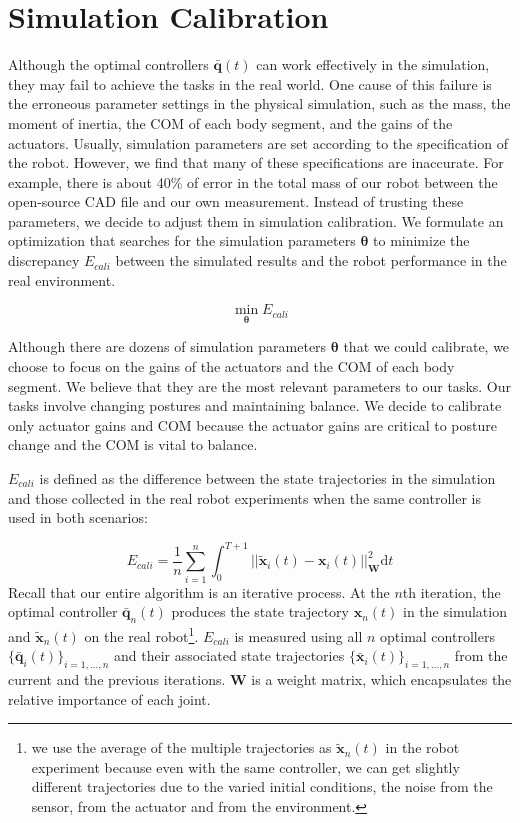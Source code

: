\section{Simulation Calibration}
Although the optimal controllers $\bar{\mathbf{q}}(t)$ can work effectively in the simulation, they may fail to achieve the tasks in the real world. One cause of this failure is the erroneous parameter settings in the physical simulation, such as the mass, the moment of inertia, the COM of each body segment, and the gains of the actuators. Usually, simulation parameters are set according to the specification of the robot. However, we find that many of these specifications are inaccurate. For example, there is about 40\% of error in the total mass of our robot between the open-source CAD file and our own measurement. Instead of trusting these parameters, we decide to adjust them in simulation calibration. We formulate an optimization that searches for the simulation parameters $\boldsymbol{\theta}$ to minimize the discrepancy $E_{cali}$ between the simulated results and the robot performance in the real environment.

\begin{equation}
 \min_{\boldsymbol{\theta}} E_{cali}
\label{eqn:calibration}
\end{equation}

Although there are dozens of simulation parameters $\boldsymbol{\theta}$ that we could calibrate, we choose to focus on the gains of the actuators and the COM of each body segment. We believe that they are the most relevant parameters to our tasks. Our tasks involve changing postures and maintaining balance. We decide to calibrate only actuator gains and COM because the actuator gains are critical to posture change and the COM is vital to balance.

$E_{cali}$ is defined as the difference between the state trajectories in the simulation and those collected in the real robot experiments when the same controller is used in both scenarios:

\begin{equation}
  E_{cali}=\frac{1}{n}\sum_{i=1}^{n}\int_{0}^{T+1}||\tilde{\mathbf{x}}_i(t)-\mathbf{x}_i(t)||_{\mathbf{W}}^2\mathrm{d}t
  \label{eqn:calibrationObj}
\end{equation}
Recall that our entire algorithm is an iterative process. At the $n$th iteration, the optimal controller $\bar{\mathbf{q}}_n(t)$ produces the state trajectory $\mathbf{x}_n(t)$ in the simulation and $\tilde{\mathbf{x}}_n(t)$ on the real robot\footnote{we use the average of the multiple trajectories as $\tilde{\mathbf{x}}_n(t)$ in the robot experiment because even with the same controller, we can get slightly different trajectories due to the varied initial conditions, the noise from the sensor, from the actuator and from the environment.}. $E_{cali}$ is measured using all $n$ optimal controllers $\{\bar{\mathbf{q}}_i(t)\}_{i=1,...,n}$ and their associated state trajectories $\{\bar{\mathbf{x}}_i(t)\}_{i=1,...,n}$ from the current and the previous iterations. $\mathbf{W}$ is a weight matrix, which encapsulates the relative importance of each joint.

